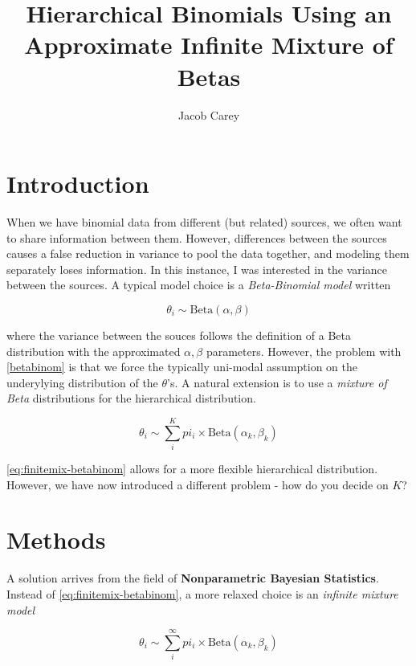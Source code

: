 \documentclass{article}
\begin{document}
\title{Hierarchical Binomials Using an Approximate Infinite Mixture of Betas}
\author{Jacob Carey}

\maketitle

\section{Introduction}

When we have binomial data from different (but related) sources, we often want to share information between them. However, differences between the sources causes a false reduction in variance to pool the data together, and modeling them separately loses information. In this instance, I was interested in the variance between the sources. A typical model choice is a \textit{Beta-Binomial model} written

\begin{equation}\label{betabinom}
\theta_i \sim \text{Beta}(\alpha, \beta)
\end{equation}

where the variance between the souces follows the definition of a Beta distribution with the approximated $\alpha, \beta$ parameters. However, the problem with \eqref{betabinom} is that we force the typically uni-modal assumption on the underylying distribution of the $\theta$'s. A natural extension is to use a \textit{mixture of Beta} distributions for the hierarchical distribution.

\begin{equation}\label{eq:finitemix-betabinom}
\theta_i \sim \sum_i^K pi_i \times \text{Beta}(\alpha_k, \beta_k)
\end{equation}

\eqref{eq:finitemix-betabinom} allows for a more flexible hierarchical distribution. However, we have now introduced a different problem - how do you decide on $K$?

\section{Methods}

A solution arrives from the field of \textbf{Nonparametric Bayesian Statistics}. Instead of \eqref{eq:finitemix-betabinom}, a more relaxed choice is an \textit{infinite mixture model}

\begin{equation}\label{eq:infinitemix-betabinom}
\theta_i \sim \sum_i^{\infty} pi_i \times \text{Beta}(\alpha_k, \beta_k)
\end{equation}
\end{document}

